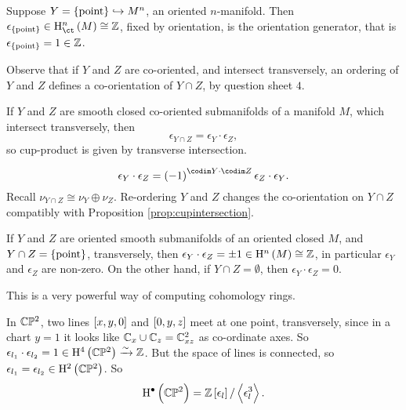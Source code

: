 \begin{example*}
Suppose $ Y = \pt \hookrightarrow M^n $, an oriented $ n $-manifold. Then $ \epsilon_{\pt} \in \Hc^n\br{M} \cong \ZZ $, fixed by orientation, is the orientation generator, that is $ \epsilon_{\pt} = 1 \in \ZZ $.
\end{example*}

Observe that if $ Y $ and $ Z $ are co-oriented, and intersect transversely, an ordering of $ Y $ and $ Z $ defines a co-orientation of $ Y \cap Z $, by question sheet $ 4 $.

\begin{proposition}
\label{prop:cupintersection}
If $ Y $ and $ Z $ are smooth closed co-oriented submanifolds of a manifold $ M $, which intersect transversely, then
$$ \epsilon_{Y \cap Z} = \epsilon_Y \cdot \epsilon_Z, $$
so cup-product is given by transverse intersection.
\end{proposition}

\begin{remark*}
$$ \epsilon_Y \cdot \epsilon_Z = \br{-1}^{\codim Y \cdot \codim Z}\epsilon_Z \cdot \epsilon_Y. $$
Recall $ \nu_{Y \cap Z} \cong \nu_Y \oplus \nu_Z $. Re-ordering $ Y $ and $ Z $ changes the co-orientation on $ Y \cap Z $ compatibly with Proposition \ref{prop:cupintersection}.
\end{remark*}

\begin{corollary}
If $ Y $ and $ Z $ are oriented smooth submanifolds of an oriented closed $ M $, and $ Y \cap Z = \pt $, transversely, then $ \epsilon_Y \cdot \epsilon_Z = \pm 1 \in \H^n\br{M} \cong \ZZ $, in particular $ \epsilon_Y $ and $ \epsilon_Z $ are non-zero. On the other hand, if $ Y \cap Z = \emptyset $, then $ \epsilon_Y \cdot \epsilon_Z = 0 $.
\end{corollary}

This is a very powerful way of computing cohomology rings.

\begin{example*}
In $ \mathbb{C}\mathbb{P}^2 $, two lines $ \sbr{x, y, 0} $ and $ \sbr{0, y, z} $ meet at one point, transversely, since in a chart $ y = 1 $ it looks like $ \mathbb{C}_x \cup \mathbb{C}_z = \mathbb{C}_{xz}^2 $ as co-ordinate axes. So $ \epsilon_{l_1} \cdot \epsilon_{l_2} = 1 \in \H^4\br{\CC\PP^2} \xrightarrow{\sim} \ZZ $. But the space of lines is connected, so $ \epsilon_{l_1} = \epsilon_{l_2} \in \H^2\br{\CC\PP^2} $. So
$$ \H^\bullet\br{\CC\PP^2} = \ZZ\sbr{\epsilon_l} / \abr{\epsilon_l^3}. $$
\end{example*}

